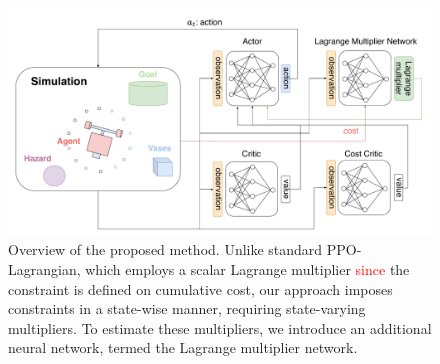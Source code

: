 \begin{figure}[h]
    \centering

    \includegraphics[width=0.8\linewidth]{figure/ppo_lagnet.pdf}
    \caption{Overview of the proposed method.
            Unlike standard PPO-Lagrangian, which employs a scalar Lagrange multiplier \textcolor{red}{since} the constraint is defined on cumulative cost, our approach imposes constraints in a state-wise manner, requiring state-varying multipliers. 
            To estimate these multipliers, we introduce an additional neural network, termed the Lagrange multiplier network.}
    \label{fig:ppo_lagnet}
\end{figure}

